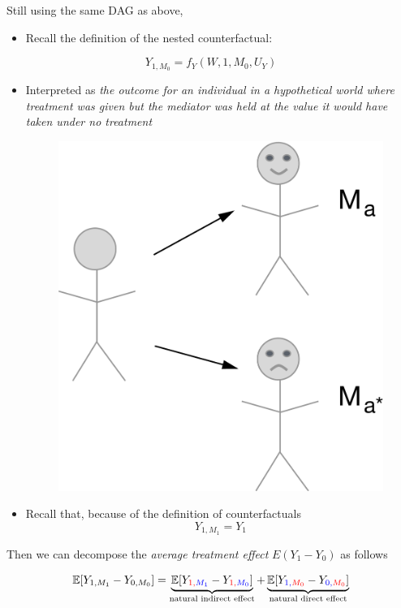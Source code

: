 \documentclass[
  12pt,
]{book}
\providecommand{\tightlist}{%
  \setlength{\itemsep}{0pt}\setlength{\parskip}{0pt}}
\theoremstyle{definition}
\theoremstyle{definition}
\theoremstyle{definition}
\newcommand{\E}{\mathbb{E}}
\newcommand{\1}{\mathbbm{1}}
\begin{document}
Still using the same DAG as above,

\begin{itemize}
\tightlist
\item
  Recall the definition of the nested counterfactual:
\end{itemize}

\begin{equation*}
  Y_{1, M_0} = f_Y(W, 1, M_0, U_Y)
\end{equation*}

\begin{itemize}
\item
  Interpreted as \emph{the outcome for an individual in a hypothetical world where
  treatment was given but the mediator was held at the value it would have
  taken under no treatment}

  \begin{figure}

  {\centering \includegraphics[width=0.5\linewidth]{img/graphic4a} 

  }

  \end{figure}
\item
  Recall that, because of the definition of counterfactuals
  \begin{equation*}
  Y_{1, M_1} = Y_1
  \end{equation*}
\end{itemize}

Then we can decompose the \emph{average treatment effect} \(E(Y_1-Y_0)\) as follows

\begin{equation*}
\E[Y_{1,M_1} - Y_{0,M_0}] = \underbrace{\E[Y_{\color{red}{1},\color{blue}{M_1}} -
    Y_{\color{red}{1},\color{blue}{M_0}}]}_{\text{natural indirect effect}} +
    \underbrace{\E[Y_{\color{blue}{1},\color{red}{M_0}} -
    Y_{\color{blue}{0},\color{red}{M_0}}]}_{\text{natural direct effect}}
\end{equation*}
\end{document}
